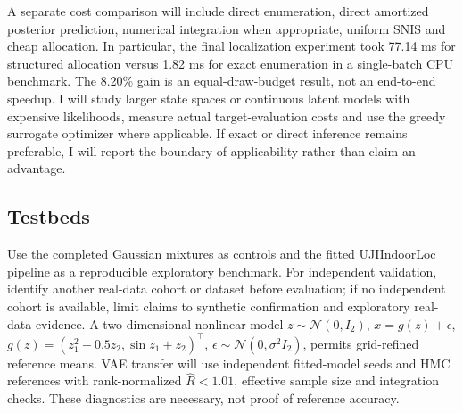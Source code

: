 \documentclass[10pt,letterpaper]{article}
\newcommand{\N}{\mathcal N}
\begin{document}
A separate cost comparison will include direct enumeration, direct amortized posterior prediction, numerical integration when appropriate, uniform SNIS and cheap allocation. In particular, the final localization experiment took 77.14 ms for structured allocation versus 1.82 ms for exact enumeration in a single-batch CPU benchmark. The 8.20\% gain is an equal-draw-budget result, not an end-to-end speedup. I will study larger state spaces or continuous latent models with expensive likelihoods, measure actual target-evaluation costs and use the greedy surrogate optimizer where applicable. If exact or direct inference remains preferable, I will report the boundary of applicability rather than claim an advantage.
\subsection{Testbeds}
Use the completed Gaussian mixtures as controls and the fitted UJIIndoorLoc pipeline as a reproducible exploratory benchmark. For independent validation, identify another real-data cohort or dataset before evaluation; if no independent cohort is available, limit claims to synthetic confirmation and exploratory real-data evidence. A two-dimensional nonlinear model $z\sim\N(0,I_2)$, $x=g(z)+\epsilon$, $g(z)=(z_1^2+0.5z_2,\sin z_1+z_2)^\top$, $\epsilon\sim\N(0,\sigma^2I_2)$, permits grid-refined reference means. VAE transfer will use independent fitted-model seeds and HMC references with rank-normalized $\widehat R<1.01$, effective sample size and integration checks. These diagnostics are necessary, not proof of reference accuracy.
\end{document}
